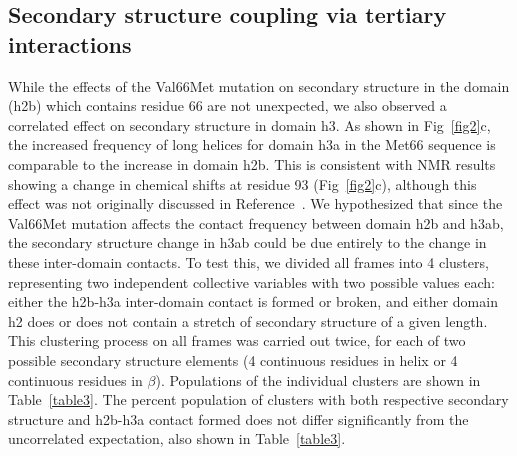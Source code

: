 \documentclass[10pt,letterpaper]{article}
\begin{document}
\subsection{Secondary structure coupling via tertiary interactions} 



While the effects of the Val66Met mutation on secondary structure in the domain (h2b) which contains residue 66 are not unexpected, we also observed a correlated effect on secondary structure in domain h3. As shown in Fig~\ref{fig2}c, the increased frequency of long helices for domain h3a in the Met66 sequence is comparable to the increase in domain h2b. This is consistent with NMR results~\cite{Anastasia2013} showing a change in chemical shifts at residue 93 (Fig~\ref{fig2}c), although this effect was not originally discussed in Reference~\cite{Anastasia2013}. We hypothesized that since the Val66Met mutation affects the contact frequency between domain h2b and h3ab, the secondary structure change in h3ab could be due entirely to the change in these inter-domain contacts. To test this, we divided all frames into 4 clusters, representing two independent collective variables with two possible values each: either the h2b-h3a inter-domain contact is formed or broken, and either domain h2 does or does not contain a stretch of secondary structure of a given length. This clustering process on all frames was carried out twice, for each of two possible secondary structure elements (4 continuous residues in helix or 4 continuous residues in $\beta$). Populations of the individual clusters are shown in Table~\ref{table3}. The percent population of clusters with both respective secondary structure and h2b-h3a contact formed does not differ significantly from the uncorrelated expectation, also shown in Table~\ref{table3}.
\end{document}
